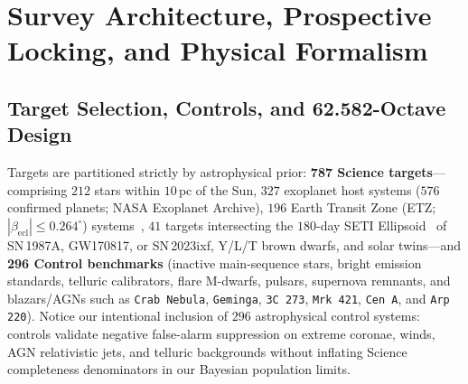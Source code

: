 \documentclass[twocolumn,10pt]{article}
\begin{document}
\section{Survey Architecture, Prospective Locking, and Physical Formalism}
\label{sec:design}

\subsection{Target Selection, Controls, and 62.582-Octave Design}
Targets are partitioned strictly by astrophysical prior: \textbf{787 Science targets}---comprising $212$ stars within $10\,\mathrm{pc}$ of the Sun, $327$ exoplanet host systems ($576$ confirmed planets; NASA Exoplanet Archive), $196$ Earth Transit Zone (ETZ; $|\beta_{\mathrm{ecl}}| \le 0.264^\circ$) systems~\cite{Kaltenegger2021}, $41$ targets intersecting the $180$-day SETI Ellipsoid~\cite{Davenport2022} of SN\,1987A, GW170817, or SN\,2023ixf, Y/L/T brown dwarfs, and solar twins---and \textbf{296 Control benchmarks} (inactive main-sequence stars, bright emission standards, telluric calibrators, flare M-dwarfs, pulsars, supernova remnants, and blazars/AGNs such as \texttt{Crab Nebula}, \texttt{Geminga}, \texttt{3C\,273}, \texttt{Mrk\,421}, \texttt{Cen\,A}, and \texttt{Arp\,220}). Notice our intentional inclusion of $296$ astrophysical control systems: controls validate negative false-alarm suppression on extreme coronae, winds, AGN relativistic jets, and telluric backgrounds without inflating Science completeness denominators in our Bayesian population limits.
\end{document}
